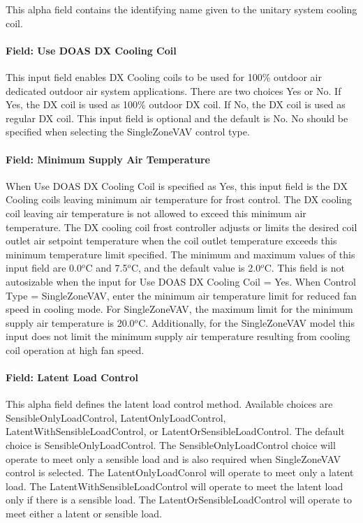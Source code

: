 This alpha field contains the identifying name given to the unitary system cooling coil.

\paragraph{Field: Use DOAS DX Cooling Coil}\label{field-use-doas-dx-cooling-coil}

This input field enables DX Cooling coils to be used for 100\% outdoor air dedicated outdoor air system applications. There are two choices Yes or No. If Yes, the DX coil is used as 100\% outdoor DX coil. If No, the DX coil is used as regular DX coil. This input field is optional and the default is No. No should be specified when selecting the SingleZoneVAV control type.

\paragraph{Field: Minimum Supply Air Temperature}

When Use DOAS DX Cooling Coil is specified as Yes, this input field is the DX Cooling coils leaving minimum air temperature for frost control. The DX cooling coil leaving air temperature is not allowed to exceed this minimum air temperature. The DX cooling coil frost controller adjusts or limits the desired coil outlet air setpoint temperature when the coil outlet temperature exceeds this minimum temperature limit specified. The minimum and maximum values of this input field are 0.0\(^{o}\)C and 7.5\(^{o}\)C, and the default value is 2.0\(^{o}\)C. This field is not autosizable when the input for Use DOAS DX Cooling Coil = Yes. When Control Type = SingleZoneVAV, enter the minimum air temperature limit for reduced fan speed in cooling mode. For SingleZoneVAV, the maximum limit for the minimum supply air temperature is 20.0\(^{o}\)C. Additionally, for the SingleZoneVAV model this input does not limit the minimum supply air temperature resulting from cooling coil operation at high fan speed.


\paragraph{Field: Latent Load Control}\label{field-latent-load-control}

This alpha field defines the latent load control method. Available choices are SensibleOnlyLoadControl, LatentOnlyLoadControl, LatentWithSensibleLoadControl, or LatentOrSensibleLoadControl. The default choice is SensibleOnlyLoadControl. The SensibleOnlyLoadControl choice will operate to meet only a sensible load and is also required when SingleZoneVAV control is selected. The LatentOnlyLoadConrol will operate to meet only a latent load. The LatentWithSensibleLoadControl will operate to meet the latent load only if there is a sensible load. The LatentOrSensibleLoadControl will operate to meet either a latent or sensible load.

